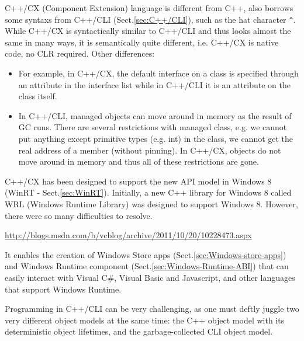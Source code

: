 C++/CX (Component Extension) language is different from C++, also borrows some
syntaxs from C++/CLI  (Sect.\ref{sec:C++/CLI}), such as the hat character
\verb!^!. While C++/CX is syntactically similar to C++/CLI and thus looks almost
the same in many ways, it is semantically quite different, i.e. C++/CX is native code, no
CLR required. Other differences:
\begin{itemize}
  \item   For example, in C++/CX, the default interface on a class is specified
  through an attribute in the interface list while in C++/CLI it is an attribute
  on the class itself. 
  
  \item In C++/CLI, managed objects can move around in memory as the result of
  GC runs. There are several restrictions with managed class, e.g. we cannot
  put anything except primitive types (e.g. int) in the class, we cannot get
  the real address of a member (without pinning). In C++/CX, objects do not move
  around in memory and thus all of these restrictions are gone.
\end{itemize}

C++/CX has been designed to support the new API model in Windows 8 (WinRT -
Sect.\ref{sec:WinRT}). Initially, a new C++ library for Windows 8 called WRL
(Windows Runtime Library) was designed to support Windows 8. However, there were
so many difficulties to resolve.

\url{http://blogs.msdn.com/b/vcblog/archive/2011/10/20/10228473.aspx}

It enables the creation of Windows Store apps
(Sect.\ref{sec:Windows-store-apps}) and Windows Runtime component
(Sect.\ref{sec:Windows-Runtime-ABI}) that can easily interact with Visual C\#, Visual Basic and Javascript, and other languages that support
Windows Runtime. 

Programming in C++/CLI can be very challenging, as one must deftly juggle two
very different object models at the same time: the C++ object model with its
deterministic object lifetimes, and the garbage-collected CLI object model.


